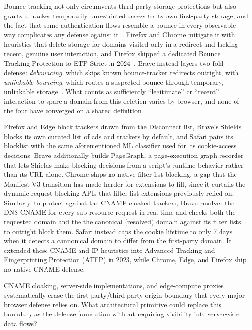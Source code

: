 %
Bounce tracking not only circumvents third-party storage protections but also grants a tracker temporarily unrestricted access to its own first-party storage, and the fact that some authentication flows resemble a bounce in every observable way complicates any defense against it~\cite{kellyBounceTrackingMitigations2022}.
%
Firefox and Chrome mitigate it with heuristics that delete storage for domains visited only in a redirect and lacking recent, genuine user interaction, and Firefox shipped a dedicated Bounce Tracking Protection to ETP Strict in 2024~\cite{snyderNavigationalTrackingMitigations2024}.
%
Brave instead layers two-fold defense: \textit{debouncing}, which skips known bounce-tracker redirects outright, with \textit{unlinkable bouncing}, which routes a suspected bounce through temporary, unlinkable storage~\cite{braveprivacyteamUnlinkableBouncingMore2022}.
%
What counts as sufficiently ``legitimate'' or ``recent'' interaction to spare a domain from this deletion varies by browser, and none of the four have converged on a shared definition.


%
Firefox and Edge block trackers drawn from the Disconnect list, Brave's Shields blocks its own curated list of ads and trackers by default, and Safari pairs its blocklist with the same aforementioned ML classifier used for its cookie-access decisions.
%
Brave additionally builds PageGraph, a page-execution graph recorder that lets Shields make blocking decisions from a script's runtime behavior rather than its URL alone.
%
Chrome ships no native filter-list blocking, a gap that the Manifest V3 transition has made harder for extensions to fill, since it curtails the dynamic request-blocking APIs that filter-list extensions previously relied on.
%
Similarly, to protect against the CNAME cloaked trackers, Brave resolves the DNS CNAME for every sub-resource request in real-time and checks both the requested domain and the the canonical (resolved) domain against its filter lists to outright block them. 
%
Safari instead caps the cookie lifetime to only 7 days when it detects a cannonical domain to differ from the first-party domain.
%
It extended these CNAME and IP heuristics into Advanced Tracking and Fingerprinting Protection (ATFP) in 2023, while Chrome, Edge, and Firefox ship no native CNAME defense.


\begin{opbox}
CNAME cloaking, server-side implementations, and edge-compute proxies systematically erase the first-party/third-party origin boundary that every major browser defense relies on. What architectural primitive could replace this boundary as the defense foundation without requiring visibility into server-side data flows?
\end{opbox}



